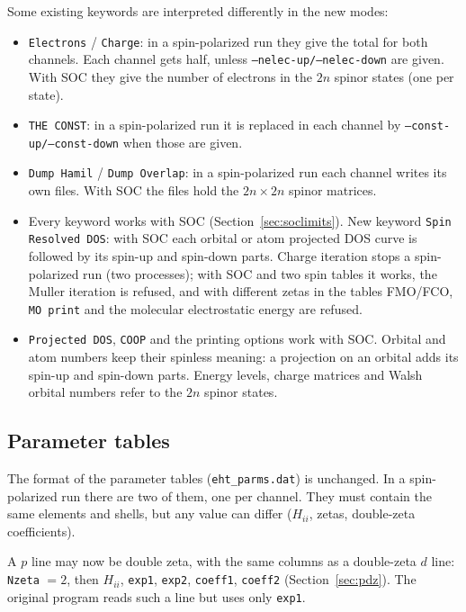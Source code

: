 \documentclass[11pt,a4paper]{article}
\newcommand{\file}[1]{\texttt{#1}}
\newcommand{\opt}[1]{\texttt{#1}}
\begin{document}
Some existing keywords are interpreted differently in the new modes:
\begin{itemize}
\item \texttt{Electrons} / \texttt{Charge}: in a spin-polarized run they give the total for
  both channels. Each channel gets half, unless \opt{--nelec-up/--nelec-down} are given.
  With SOC they give the number of electrons in the $2n$ spinor states (one per state).
\item \texttt{THE CONST}: in a spin-polarized run it is replaced in each channel by
  \opt{--const-up/--const-down} when those are given.
\item \texttt{Dump Hamil} / \texttt{Dump Overlap}: in a spin-polarized run each channel
  writes its own files. With SOC the files hold the $2n\times2n$ spinor matrices.
\item Every keyword works with SOC (Section~\ref{sec:soclimits}). New keyword
  \texttt{Spin Resolved DOS}: with SOC each orbital or atom projected DOS curve is followed
  by its spin-up and spin-down parts. Charge iteration stops a spin-polarized run (two
  processes); with SOC and two spin tables it works, the Muller iteration is refused, and
  with different zetas in the tables FMO/FCO, \texttt{MO print} and the molecular
  electrostatic energy are refused.
\item \texttt{Projected DOS}, \texttt{COOP} and the printing options work with SOC.
  Orbital and atom numbers keep their spinless meaning: a projection on an orbital adds
  its spin-up and spin-down parts. Energy levels, charge matrices and Walsh orbital
  numbers refer to the $2n$ spinor states.
\end{itemize}

\subsection{Parameter tables}

The format of the parameter tables (\file{eht\_parms.dat}) is unchanged. In a
spin-polarized run there are two of them, one per channel. They must contain the same
elements and shells, but any value can differ ($H_{ii}$, zetas, double-zeta
coefficients).

A $p$ line may now be double zeta, with the same columns as a double-zeta $d$ line:
\texttt{Nzeta} $=2$, then $H_{ii}$, \texttt{exp1}, \texttt{exp2}, \texttt{coeff1},
\texttt{coeff2} (Section~\ref{sec:pdz}). The original program reads such a line but uses
only \texttt{exp1}.
\end{document}
